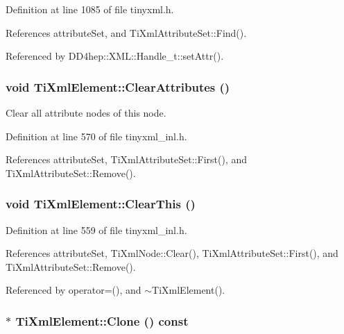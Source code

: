 Definition at line 1085 of file tinyxml.h.

References attributeSet, and TiXmlAttributeSet::Find().

Referenced by DD4hep::XML::Handle\_\-t::setAttr().\hypertarget{class_ti_xml_element_a11ad3e12a953d9b9aaae7625bf872a7a}{
\subsubsection[{ClearAttributes}]{\setlength{\rightskip}{0pt plus 5cm}void TiXmlElement::ClearAttributes ()}}
\label{class_ti_xml_element_a11ad3e12a953d9b9aaae7625bf872a7a}
Clear all attribute nodes of this node. 

Definition at line 570 of file tinyxml\_\-inl.h.

References attributeSet, TiXmlAttributeSet::First(), and TiXmlAttributeSet::Remove().\hypertarget{class_ti_xml_element_a5670933ec2d7d9763b9891acc05d7f7d}{
\subsubsection[{ClearThis}]{\setlength{\rightskip}{0pt plus 5cm}void TiXmlElement::ClearThis ()}}
\label{class_ti_xml_element_a5670933ec2d7d9763b9891acc05d7f7d}


Definition at line 559 of file tinyxml\_\-inl.h.

References attributeSet, TiXmlNode::Clear(), TiXmlAttributeSet::First(), and TiXmlAttributeSet::Remove().

Referenced by operator=(), and $\sim$TiXmlElement().\hypertarget{class_ti_xml_element_a13f6df105ebb1e8dc636e75cc883be32}{
\subsubsection[{Clone}]{ $\ast$ TiXmlElement::Clone () const}}
\label{class_ti_xml_element_a13f6df105ebb1e8dc636e75cc883be32}


